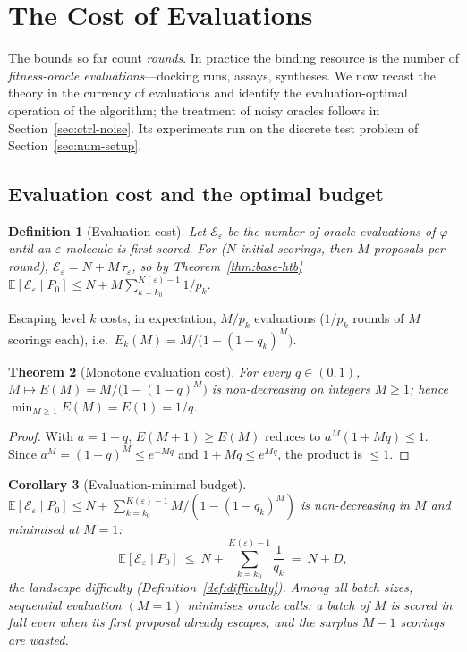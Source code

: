 \documentclass[11pt,a4paper]{article}
\newtheorem{theorem}{Theorem}[section]
\newtheorem{corollary}[theorem]{Corollary}
\newtheorem{definition}[theorem]{Definition}
\newcommand{\E}{\mathbb{E}}
\newcommand{\evals}{\mathcal{E}}
\begin{document}
\section{The Cost of Evaluations}
\label{sec:control}

The bounds so far count \emph{rounds}.  In practice the binding resource
is the number of \emph{fitness-oracle evaluations}---docking runs, assays,
syntheses.  We now recast the theory in the currency of evaluations and
identify the evaluation-optimal operation of the algorithm; the treatment
of noisy oracles follows in Section~\ref{sec:ctrl-noise}.  Its experiments
run on the discrete test problem of Section~\ref{sec:num-setup}.

\subsection{Evaluation cost and the optimal budget}
\label{sec:ctrl-budget}

\begin{definition}[Evaluation cost]\label{def:evalcost}
  Let $\evals_\varepsilon$ be the number of oracle evaluations of
  $\varphi$ until an $\varepsilon$-molecule is first scored.  For
   ($N$ initial scorings, then $M$ proposals per round),
  $\evals_\varepsilon=N+M\,\tau_\varepsilon$, so by
  Theorem~\ref{thm:base-htb}
  $\E[\evals_\varepsilon\mid P_0]\le N+M\sum_{k=k_0}^{K(\varepsilon)-1}1/p_k$.
\end{definition}

Escaping level $k$ costs, in expectation, $M/p_k$ evaluations
($1/p_k$ rounds of $M$ scorings each), i.e.\
$E_k(M)=M/\bigl(1-(1-q_k)^M\bigr)$.

\begin{theorem}[Monotone evaluation cost]\label{thm:monoeval}
  For every $q\in(0,1)$, $M\mapsto E(M)=M/\bigl(1-(1-q)^M\bigr)$ is
  non-decreasing on integers $M\ge1$; hence $\min_{M\ge1}E(M)=E(1)=1/q$.
\end{theorem}

\begin{proof}
  With $a=1-q$, $E(M{+}1)\ge E(M)$ reduces to $a^{M}(1+Mq)\le1$.  Since
  $a^{M}=(1-q)^M\le e^{-Mq}$ and $1+Mq\le e^{Mq}$, the product is $\le1$.
\end{proof}

\begin{corollary}[Evaluation-minimal budget]\label{cor:minbudget}
  $\E[\evals_\varepsilon\mid P_0]\le N+\sum_{k=k_0}^{K(\varepsilon)-1}M/(1-(1-q_k)^M)$
  is non-decreasing in $M$ and minimised at $M=1$:
  \[
    \E[\evals_\varepsilon\mid P_0]\ \le\ N+\sum_{k=k_0}^{K(\varepsilon)-1}\frac1{q_k}
    \ =\ N+D,
  \]
  the landscape difficulty (Definition~\ref{def:difficulty}).  Among all batch
  sizes, sequential evaluation $(M=1)$ minimises oracle calls: a batch of
  $M$ is scored in full even when its first proposal already escapes, and
  the surplus $M-1$ scorings are wasted.
\end{corollary}
\end{document}
